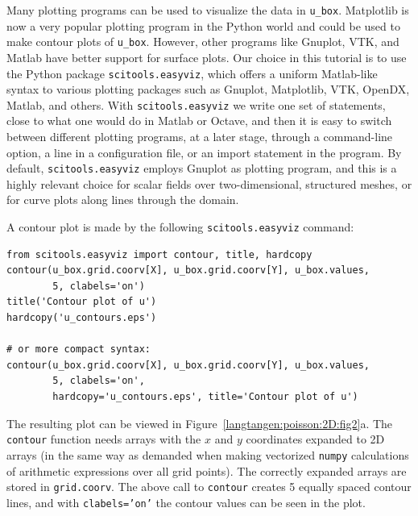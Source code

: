 Many plotting programs can be used to visualize the data in
{\fontsize{12pt}{12pt}\verb!u_box!}.  Matplotlib is now a very popular plotting program in
the Python world and could be used to make contour plots of
{\fontsize{12pt}{12pt}\verb!u_box!}. However, other programs like Gnuplot, VTK, and Matlab have better
support for surface plots. Our choice in this tutorial is to use the
Python package {\fontsize{12pt}{12pt}\texttt{scitools.easyviz}}, which offers a uniform
Matlab-like syntax to various plotting packages such as Gnuplot,
Matplotlib, VTK, OpenDX, Matlab, and others. With {\fontsize{12pt}{12pt}\texttt{scitools.easyviz}} we
write one set of statements, close to what one would do in Matlab or
Octave, and then it is easy to switch between different plotting
programs, at a later stage, through a command-line option, a line in a
configuration file, or an import statement in the program.  By
default, {\fontsize{12pt}{12pt}\texttt{scitools.easyviz}} employs Gnuplot as plotting program,
and this is a highly relevant choice for scalar fields over two-dimensional,
structured meshes, or for curve plots along lines through the domain.

A contour plot is made by the following {\fontsize{12pt}{12pt}\texttt{scitools.easyviz}} command:
\begin{Verbatim}[fontsize=\fontsize{10pt}{10pt},tabsize=8,baselinestretch=1.05,
fontfamily=tt,xleftmargin=7mm]
from scitools.easyviz import contour, title, hardcopy
contour(u_box.grid.coorv[X], u_box.grid.coorv[Y], u_box.values,
        5, clabels='on')
title('Contour plot of u')
hardcopy('u_contours.eps')

# or more compact syntax:
contour(u_box.grid.coorv[X], u_box.grid.coorv[Y], u_box.values,
        5, clabels='on',
        hardcopy='u_contours.eps', title='Contour plot of u')
\end{Verbatim}
\noindent
The resulting plot can be viewed in Figure~\ref{langtangen:poisson:2D:fig2}a.
The {\fontsize{12pt}{12pt}\texttt{contour}} function needs arrays with the $x$ and $y$ coordinates
expanded to 2D arrays (in the same way as demanded when
making vectorized
{\fontsize{12pt}{12pt}\texttt{numpy}} calculations of arithmetic expressions over all grid points).
The correctly expanded arrays are stored in {\fontsize{12pt}{12pt}\texttt{grid.coorv}}.
The above call to
{\fontsize{12pt}{12pt}\texttt{contour}} creates 5 equally spaced contour lines, and with
{\fontsize{12pt}{12pt}\texttt{clabels='on'}} the contour values can be seen in the plot.

